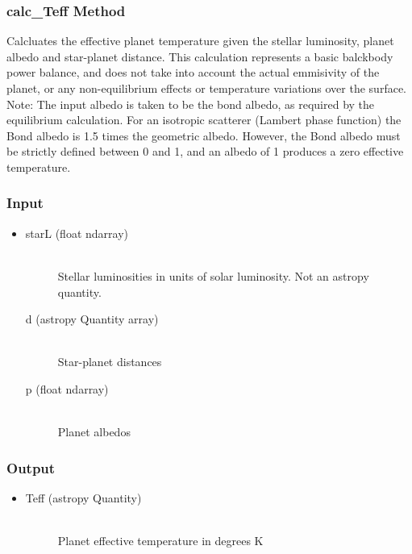 \documentclass[cleanfoot]{asme2ej}
\begin{document}
\subsubsection{calc\_Teff Method} \label{sec:calcteff}
Calcluates the effective planet temperature given the stellar luminosity, planet albedo and star-planet distance. This calculation represents a basic balckbody power balance, and does not take into account the actual emmisivity of the planet, or any non-equilibrium effects or temperature variations over the surface. \\
Note:  The input albedo is taken to be the bond albedo, as required by the equilibrium calculation. For an isotropic scatterer (Lambert phase function) the Bond albedo is 1.5 times the geometric albedo. However, the Bond albedo must be strictly defined between 0 and 1, and an albedo of 1 produces a zero effective temperature.
\subsubsection*{Input}
\begin{itemize}
\item
\begin{description}
    \item[starL (float ndarray)] \hfill \\ Stellar luminosities in units of solar luminosity. Not an astropy quantity.
    \item[d (astropy Quantity array)] \hfill \\ Star-planet distances
    \item[p (float ndarray)] \hfill \\ Planet albedos
\end{description}
\end{itemize}
\subsubsection*{Output}
\begin{itemize}
\item
\begin{description}
    \item[Teff (astropy Quantity)] \hfill \\ Planet effective temperature in degrees K
\end{description}
\end{itemize}

\end{document}
